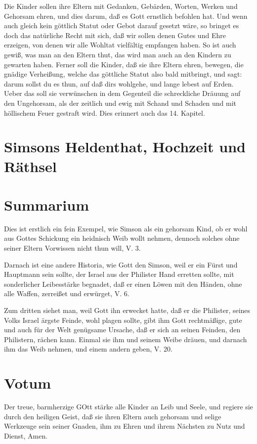 Die Kinder sollen ihre Eltern mit Gedanken, Gebärden, Worten, Werken und Gehorsam ehren, und dies darum, daß es Gott ernstlich befohlen hat. Und wenn auch gleich kein göttlich Statut oder Gebot darauf gesetzt wäre, so bringet es doch das natürliche Recht mit sich, daß wir sollen denen Gutes und Ehre erzeigen, von denen wir alle Wohltat vielfältig empfangen haben. So ist auch gewiß, was man an den Eltern thut, das wird man auch an den Kindern zu gewarten haben. Ferner soll die Kinder, daß sie ihre Eltern ehren, bewegen, die gnädige Verheißung, welche das göttliche Statut also bald mitbringt, und sagt: darum sollst du es thun, auf daß dirs wohlgehe, und lange lebest auf Erden. Ueber das soll sie verwünschen in dem Gegenteil die schreckliche Dräuung auf den Ungehorsam, als der zeitlich und ewig mit Schand und Schaden und mit höllischem Feuer gestraft wird. Dies erinnert auch das 14. Kapitel.

\section{Simsons Heldenthat, Hochzeit und Räthsel}
\section{Summarium}

Dies ist erstlich ein fein Exempel, wie Simson als ein gehorsam Kind, ob er wohl aus Gottes Schickung ein heidnisch Weib wollt nehmen, dennoch solches ohne seiner Eltern Vorwissen nicht thun will, V. 3.

Darnach ist eine andere Historia, wie Gott den Simson, weil er ein Fürst und Hauptmann sein sollte, der Israel aus der Philister Hand erretten sollte, mit sonderlicher Leibesstärke begnadet, daß er einen Löwen mit den Händen, ohne alle Waffen, zerreißet und erwürget, V. 6.

Zum dritten siehet man, weil Gott ihn erwecket hatte, daß er die Philister, seines Volks Israel ärgste Feinde, wohl plagen sollte, gibt ihm Gott rechtmäßige, gute und auch für der Welt genügsame Ursache, daß er sich an seinen Feinden, den Philistern, rächen kann. Einmal sie ihm und seinem Weibe dräuen, und darnach ihm das Weib nehmen, und einem andern geben, V. 20.

\section{Votum}

Der treue, barmherzige GOtt stärke alle Kinder an Leib und Seele, und regiere sie durch den heiligen Geist, daß sie ihren Eltern auch gehorsam und selige Werkzeuge sein seiner Gnaden, ihm zu Ehren und ihrem Nächsten zu Nutz und Dienst, Amen.

